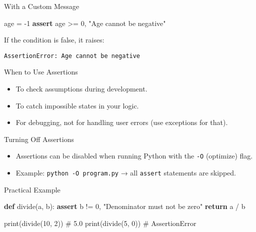 \documentclass[
  letterpaper,
  DIV=11,
  numbers=noendperiod]{scrreprt}
\newenvironment{Shaded}{\begin{snugshade}}{\end{snugshade}}
\newcommand{\BuiltInTok}[1]{\textcolor[rgb]{0.00,0.23,0.31}{#1}}
\newcommand{\CommentTok}[1]{\textcolor[rgb]{0.37,0.37,0.37}{#1}}
\newcommand{\ControlFlowTok}[1]{\textcolor[rgb]{0.00,0.23,0.31}{\textbf{#1}}}
\newcommand{\DecValTok}[1]{\textcolor[rgb]{0.68,0.00,0.00}{#1}}
\newcommand{\KeywordTok}[1]{\textcolor[rgb]{0.00,0.23,0.31}{\textbf{#1}}}
\newcommand{\NormalTok}[1]{\textcolor[rgb]{0.00,0.23,0.31}{#1}}
\newcommand{\OperatorTok}[1]{\textcolor[rgb]{0.37,0.37,0.37}{#1}}
\newcommand{\StringTok}[1]{\textcolor[rgb]{0.13,0.47,0.30}{#1}}
\providecommand{\tightlist}{%
  \setlength{\itemsep}{0pt}\setlength{\parskip}{0pt}}
\begin{document}
With a Custom Message

\begin{Shaded}
\begin{Highlighting}[]
\NormalTok{age }\OperatorTok{=} \OperatorTok{{-}}\DecValTok{1}
\ControlFlowTok{assert}\NormalTok{ age }\OperatorTok{\textgreater{}=} \DecValTok{0}\NormalTok{, }\StringTok{"Age cannot be negative"}
\end{Highlighting}
\end{Shaded}

If the condition is false, it raises:

\begin{verbatim}
AssertionError: Age cannot be negative
\end{verbatim}

When to Use Assertions

\begin{itemize}
\tightlist
\item
  To check assumptions during development.
\item
  To catch impossible states in your logic.
\item
  For debugging, not for handling user errors (use exceptions for that).
\end{itemize}

Turning Off Assertions

\begin{itemize}
\tightlist
\item
  Assertions can be disabled when running Python with the \texttt{-O}
  (optimize) flag.
\item
  Example: \texttt{python\ -O\ program.py} → all \texttt{assert}
  statements are skipped.
\end{itemize}

Practical Example

\begin{Shaded}
\begin{Highlighting}[]
\KeywordTok{def}\NormalTok{ divide(a, b):}
    \ControlFlowTok{assert}\NormalTok{ b }\OperatorTok{!=} \DecValTok{0}\NormalTok{, }\StringTok{"Denominator must not be zero"}
    \ControlFlowTok{return}\NormalTok{ a }\OperatorTok{/}\NormalTok{ b}

\BuiltInTok{print}\NormalTok{(divide(}\DecValTok{10}\NormalTok{, }\DecValTok{2}\NormalTok{))   }\CommentTok{\# 5.0}
\BuiltInTok{print}\NormalTok{(divide(}\DecValTok{5}\NormalTok{, }\DecValTok{0}\NormalTok{))    }\CommentTok{\# AssertionError}
\end{Highlighting}
\end{Shaded}
\end{document}
